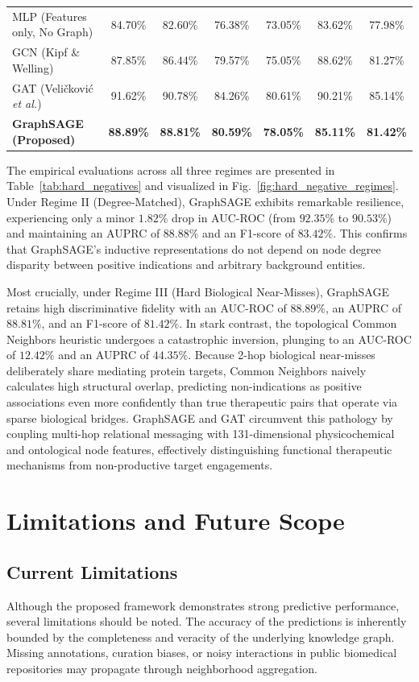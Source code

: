 \documentclass[preprint,12pt]{elsarticle}
\begin{document}
\begin{table}[!t]
{\begin{tabular}{lcccccc}
        MLP (Features only, No Graph)    & 84.70\% & 82.60\% & 76.38\% &  73.05\% & 83.62\% & 77.98\% \\
        GCN (Kipf \& Welling)~\cite{ref2} & 87.85\% & 86.44\% & 79.57\% &  75.05\% & 88.62\% & 81.27\% \\
        GAT (Veli\v{c}kovi\'c \textit{et al.})~\cite{ref_gat} & 91.62\% & 90.78\% & 84.26\% &  80.61\% & 90.21\% & 85.14\% \\
        \textbf{GraphSAGE (Proposed)}     & \textbf{88.89\%} & \textbf{88.81\%} & \textbf{80.59\%} &  \textbf{78.05\%} & \textbf{85.11\%} & \textbf{81.42\%} \\
        \bottomrule
    \end{tabular}%
    }
\end{table}

The empirical evaluations across all three regimes are presented in Table~\ref{tab:hard_negatives} and visualized in Fig.~\ref{fig:hard_negative_regimes}. Under Regime II (Degree-Matched), GraphSAGE exhibits remarkable resilience, experiencing only a minor $1.82\%$ drop in AUC-ROC (from $92.35\%$ to $90.53\%$) and maintaining an AUPRC of $88.88\%$ and an F1-score of $83.42\%$. This confirms that GraphSAGE's inductive representations do not depend on node degree disparity between positive indications and arbitrary background entities.

Most crucially, under Regime III (Hard Biological Near-Misses), GraphSAGE retains high discriminative fidelity with an AUC-ROC of $88.89\%$, an AUPRC of $88.81\%$, and an F1-score of $81.42\%$. In stark contrast, the topological Common Neighbors heuristic undergoes a catastrophic inversion, plunging to an AUC-ROC of $12.42\%$ and an AUPRC of $44.35\%$. Because 2-hop biological near-misses deliberately share mediating protein targets, Common Neighbors naively calculates high structural overlap, predicting non-indications as positive associations even more confidently than true therapeutic pairs that operate via sparse biological bridges. GraphSAGE and GAT circumvent this pathology by coupling multi-hop relational messaging with 131-dimensional physicochemical and ontological node features, effectively distinguishing functional therapeutic mechanisms from non-productive target engagements.

\section{Limitations and Future Scope}

\subsection{Current Limitations}
Although the proposed framework demonstrates strong predictive performance, several limitations should be noted. The accuracy of the predictions is inherently bounded by the completeness and veracity of the underlying knowledge graph. Missing annotations, curation biases, or noisy interactions in public biomedical repositories may propagate through neighborhood aggregation.
\end{document}
